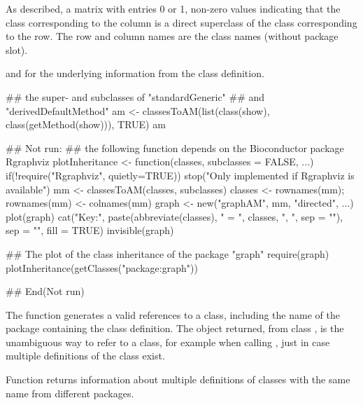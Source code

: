 %
\begin{Value}
As described, a matrix with entries 0 or 1, non-zero values
indicating that the class corresponding to the column is a direct
superclass of the class corresponding to the row.  The row and
column names are the class names (without package slot).
\end{Value}
%
\begin{SeeAlso}\relax
{} and  for the underlying information from the class
definition.
\end{SeeAlso}
%
\begin{Examples}
\begin{ExampleCode}

## the super- and subclasses of "standardGeneric"
## and "derivedDefaultMethod"
am <- classesToAM(list(class(show), class(getMethod(show))), TRUE)
am

## Not run: 
## the following function depends on the Bioconductor package Rgraphviz
plotInheritance <- function(classes, subclasses = FALSE, ...) {
    if(!require("Rgraphviz", quietly=TRUE))
      stop("Only implemented if Rgraphviz is available")
    mm <- classesToAM(classes, subclasses)
    classes <- rownames(mm); rownames(mm) <- colnames(mm)
    graph <-  new("graphAM", mm, "directed", ...)
    plot(graph)
    cat("Key:\n", paste(abbreviate(classes), " = ", classes, ", ",
        sep = ""),  sep = "", fill = TRUE)
    invisible(graph)
}

## The plot of the class inheritance of the package "graph"
require(graph)
plotInheritance(getClasses("package:graph"))


## End(Not run)
\end{ExampleCode}
\end{Examples}
%
\begin{Description}\relax
The function  generates a
valid references to a class, including the name of the package
containing the class definition.  The object returned, from class , is the
unambiguous way to refer to a class, for example when calling
, just in case multiple definitions of the
class exist.

Function
 returns information about multiple
definitions of classes with the
same name from different packages.
\end{Description}
